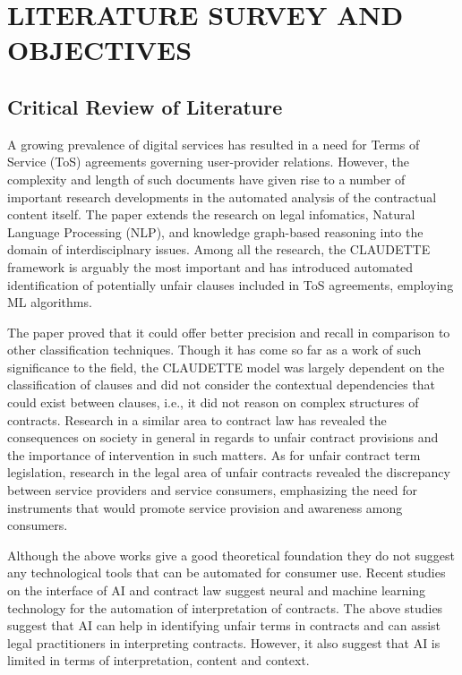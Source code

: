 
\chapter{LITERATURE SURVEY AND OBJECTIVES} %
\label{ChapterLiteratureSurvey} %

\section{Critical Review of Literature}
A growing prevalence of digital services has resulted in a need for
Terms of Service (ToS) agreements governing user-provider relations.
However, the complexity and length of such documents have given rise 
to a number of important research developments in the automated 
analysis of the contractual content itself. The paper extends the 
research on legal infomatics, Natural Language Processing (NLP), 
and knowledge graph-based reasoning into the 
domain of interdisciplnary issues. Among all the research, 
the CLAUDETTE framework is arguably the most important and has 
introduced automated identification of potentially unfair 
clauses included in ToS agreements, 
employing ML algorithms.

The paper proved that it could offer better precision and recall 
in comparison to other classification techniques. 
Though it has come so far as a work of such significance to the 
field, the CLAUDETTE model was largely dependent on the 
classification of clauses and did not consider the contextual 
dependencies that could exist between clauses, i.e., 
it did not reason on complex structures of contracts.
Research in a similar area to contract law has revealed the consequences
on society in general in regards to unfair contract provisions and the
importance of intervention in such matters. As for unfair contract
term legislation, research in the legal area of unfair contracts revealed
the discrepancy between service providers and service consumers,
emphasizing the need for instruments that would promote service
provision and awareness among consumers.

Although the above works give a good theoretical foundation they do not 
suggest any technological tools 
that can be automated for consumer use. Recent studies on the 
interface of AI and contract law suggest neural and machine learning 
technology for the automation of interpretation of contracts. 
The above studies suggest that AI can help in identifying unfair 
terms in contracts and can assist legal practitioners in interpreting 
contracts. However, it also suggest that AI is limited in terms of 
interpretation, content and context.

